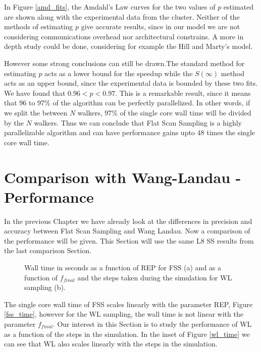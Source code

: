	In Figure \ref{amd_fits}, the Amdahl's Law curves for the two values of $p$ estimated are shown along with the experimental data from the cluster. Neither of the methods of estimating $p$ give accurate results, since in our model we are not considering communications overhead nor architectural constrains. A more in depth study could be done, considering for example the Hill and Marty's model. 

	However some strong conclusions can still be drawn.The standard method for estimating $p$ acts as a lower bound for the speedup while the $S(\infty)$ method acts as an upper bound, since the experimental data is bounded by these two fits. We have found that $0.96<p<0.97$. This is a remarkable result, since it means that 96 to 97\% of the algorithm can be perfectly parallelized. In other words, if we split the between $N$ walkers, 97\% of the single core wall time will be divided by the $N$ walkers. Thus we can conclude that Flat Scan Sampling is a highly parallelizable algorithm and can have performance gains upto 48 times the single core wall time.

\section{Comparison with Wang-Landau - Performance}

	In the previous Chapter we have already look at the differences in precision and accuracy between Flat Scan Sampling and Wang Landau. Now a comparison of the performance will be given. This Section will use the same L8 SS results from the last comparison Section.
		
\begin{figure}[h]
	\centering
	\caption{Wall time in seconds as a function of REP for FSS (a) and as a function of $f_{final}$ and the steps taken during the simulation for WL sampling (b).}
\end{figure}

	The single core wall time of FSS scales linearly with the parameter REP, Figure \ref{fss_time}, however for the WL sampling, the wall time is not linear with the parameter $f_{final}$. Our interest in this Section is to study the performance of WL as a function of the steps in the simulation. In the inset of Figure \ref{wl_time} we can see that WL also scales linearly with the steps in the simulation.
	
